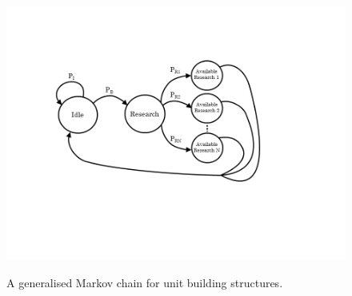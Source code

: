\begin{figure}
\centering
\includegraphics[scale=0.8, trim = 0cm 0cm 0cm 0cm]{diagrams/building_research}
\label{fig:struct_research}
\caption{A generalised Markov chain for unit building structures.}
\end{figure}